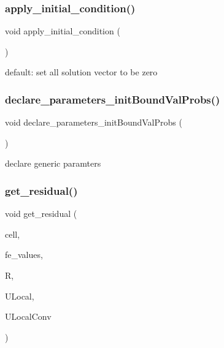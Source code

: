 \subsubsection{\texorpdfstring{apply\_initial\_condition()}{apply\_initial\_condition()}}
{\footnotesize\ttfamily void apply\+\_\+initial\+\_\+condition (\begin{DoxyParamCaption}{ }\end{DoxyParamCaption})\hspace{0.3cm}{\ttfamily [virtual]}}

default\+: set all solution vector to be zero \mbox{\label{classinit_bound_val_probs_af60fa8844da68c0cd887b300855c086c}} 
\subsubsection{\texorpdfstring{declare\_parameters\_initBoundValProbs()}{declare\_parameters\_initBoundValProbs()}}
{\footnotesize\ttfamily void declare\+\_\+parameters\+\_\+init\+Bound\+Val\+Probs (\begin{DoxyParamCaption}{ }\end{DoxyParamCaption})}

declare generic paramters \mbox{\label{classinit_bound_val_probs_ac8f2c3e2a1040c70b709900dc3dfdaea}} 
\subsubsection{\texorpdfstring{get\_residual()}{get\_residual()}}
{\footnotesize\ttfamily void get\+\_\+residual (\begin{DoxyParamCaption}\item[{const typename hp\+::\+Do\+F\+Handler$<$ dim $>$\+::active\+\_\+cell\+\_\+iterator \&}]{cell,  }\item[{const F\+E\+Values$<$ dim $>$ \&}]{fe\+\_\+values,  }\item[{Table$<$ 1, Sacado\+::\+Fad\+::\+D\+Fad$<$ double $>$ $>$ \&}]{R,  }\item[{Table$<$ 1, Sacado\+::\+Fad\+::\+D\+Fad$<$ double $>$$>$ \&}]{U\+Local,  }\item[{Table$<$ 1, double $>$ \&}]{U\+Local\+Conv }\end{DoxyParamCaption})\hspace{0.3cm}{\ttfamily [virtual]}}

